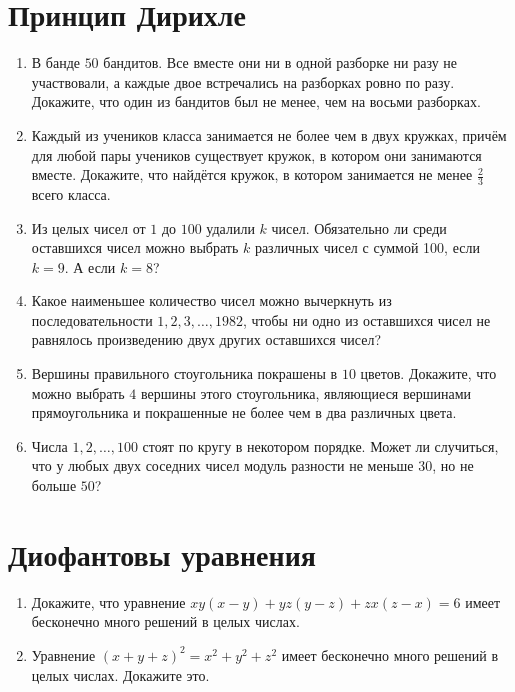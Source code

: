 \documentclass[fleqn,oneside]{book}
\begin{document}
\chapter*{Принцип Дирихле}

\begin{enumerate}
\item В банде $50$ бандитов. Все вместе они ни в одной разборке ни разу не участвовали, а каждые двое встречались на разборках ровно по разу. Докажите, что один из бандитов был не менее, чем на восьми разборках. 

\item Каждый из учеников класса занимается не более чем в двух кружках, причём для любой пары учеников существует кружок, в котором они занимаются вместе. Докажите, что найдётся кружок, в котором занимается не менее $\frac{2}{3}$ всего класса.

\item Из целых чисел от $1$ до $100$ удалили $k$ чисел. Обязательно ли среди оставшихся чисел можно выбрать $k$ различных чисел с суммой 100, если $k = 9$. А если $k = 8$?

\item Какое наименьшее количество чисел можно вычеркнуть из последовательности $1, 2, 3, \dots, 1982$, чтобы ни одно из оставшихся чисел не равнялось произведению двух других оставшихся чисел?

\item Вершины правильного стоугольника покрашены в $10$ цветов. Докажите, что можно выбрать $4$ вершины этого стоугольника, являющиеся вершинами прямоугольника и покрашенные не более чем в два различных цвета.

\item Числа $1, 2, \dots, 100$ стоят по кругу в некотором порядке. Может ли случиться, что у любых двух соседних чисел модуль разности не меньше $30$, но не больше $50$?

\end{enumerate}

\chapter*{Диофантовы уравнения}

\begin{enumerate}
\item Докажите, что уравнение $xy(x-y)+yz(y-z)+zx(z-x) = 6 $ имеет бесконечно много решений в целых числах.

\item Уравнение $(x + y + z)^{2} = x^{2} + y^{2} + z^{2}$ имеет бесконечно много решений в целых числах. Докажите это.

\end{enumerate}
\end{document}
